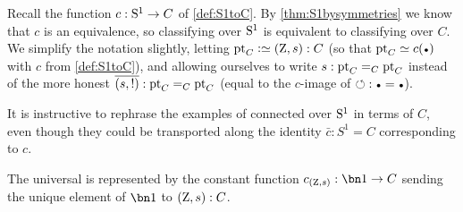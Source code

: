 Recall the function $c:{\mathrm{S}^1}\to C$ of \cref{def:S1toC}. 
By \cref{thm:S1bysymmetries} we know that $c$ is an equivalence, 
so classifying \coverings over ${\mathrm{S}^1}$ is equivalent to 
classifying \coverings over $C$.  
We simplify the notation slightly, letting $\pt_C\defeq(\zet,\etop{s}):C$ 
(so that $\pt_C \jdeq c(\base)$ with $c$ from \cref{def:S1toC}), 
and allowing ourselves to write $s:\mathrm{pt}_C=_C\mathrm{pt}_C$ instead of the 
more honest $\overline{({{s}},{!})}:\mathrm{pt}_C=_C\mathrm{pt}_C$ 
(equal to the $c$-image of ${\Sloop}:\base=\base$).

It is instructive to rephrase the examples of connected \coverings over ${\mathrm{S}^1}$ in 
terms of $C$, even though they could be transported along the identity $\bar c:S^1=C$ corresponding to $c$.

\begin{example}\label{exa:univCcover}
The universal \covering is represented by the constant function
$c_{(\zet,\etop{s})}:\bn 1\to C$ sending the unique element 
of $\bn 1$ to $(\mathrm{Z},{s}):C$.
\end{example}

